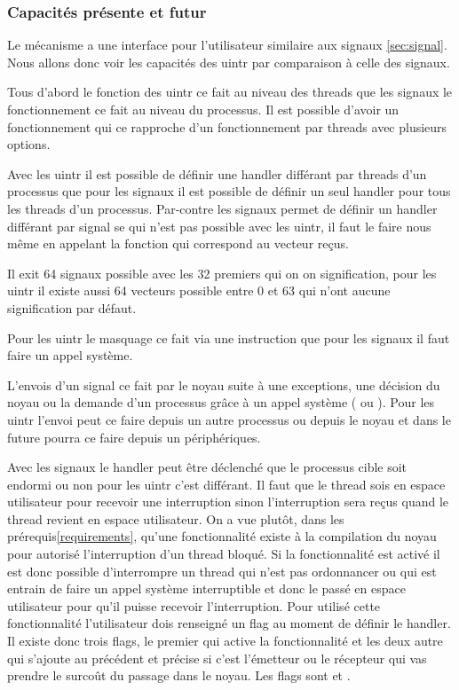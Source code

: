 \subsubsection{Capacités présente et futur}

Le mécanisme a une interface pour l'utilisateur similaire aux signaux \ref{sec:signal}.
Nous allons donc voir les capacités des uintr par comparaison à celle des signaux.

Tous d'abord le fonction des uintr ce fait au niveau des threads que les signaux le fonctionnement ce fait au niveau du processus.
Il est possible d'avoir un fonctionnement qui ce rapproche d'un fonctionnement par threads avec plusieurs options.

Avec les uintr il est possible de définir une handler différant par threads d'un processus que pour les signaux il est possible de définir un seul handler pour tous les threads d'un processus.
Par-contre les signaux permet de définir un handler différant par signal se qui n'est pas possible avec les uintr, il faut le faire nous même en appelant la fonction qui correspond au vecteur reçus. %

Il exit 64 signaux possible avec les 32 premiers qui on on signification, pour les uintr il existe aussi 64 vecteurs possible entre 0 et 63 qui n'ont aucune signification par défaut.

Pour les uintr le masquage ce fait via une instruction que pour les signaux il faut faire un appel système.

L'envois d'un signal ce fait par le noyau suite à une exceptions, une décision du noyau ou la demande d'un processus grâce à un appel système ( ou ).
Pour les uintr l'envoi peut ce faire depuis un autre processus ou depuis le noyau et dans le future pourra ce faire depuis un périphériques.

Avec les signaux le handler peut être déclenché que le processus cible soit endormi ou non pour les uintr c'est différant.
Il faut que le thread sois en espace utilisateur pour recevoir une interruption sinon l'interruption sera reçus quand le thread revient en espace utilisateur.
On a vue plutôt, dans les prérequis\ref{requirements}, qu'une fonctionnalité existe à la compilation du noyau pour autorisé l'interruption d'un thread bloqué.
Si la fonctionnalité est activé il est donc possible d'interrompre un thread qui n'est pas ordonnancer ou qui est entrain de faire un appel système interruptible et donc le passé en espace utilisateur pour qu'il puisse recevoir l'interruption. %
Pour utilisé cette fonctionnalité l'utilisateur dois renseigné un flag au moment de définir le handler.
Il existe donc trois flags, le premier  qui active la fonctionnalité et les deux autre qui s'ajoute au précédent et précise si c'est l'émetteur ou le récepteur qui vas prendre le surcoût du passage dans le noyau.
Les flags sont  et .

